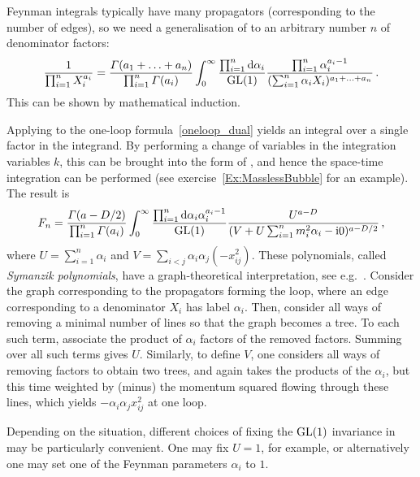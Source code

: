 Feynman integrals typically have many propagators (corresponding to the number of edges), so we need 
a generalisation of  to an arbitrary number $n$ of denominator factors:
\begin{align}\label{Feynman_general}
\frac{1}{ \prod_{i=1}^{n}  X_i^{a_i} }  = \frac{\Gamma(a_1 + \ldots + a_n) }{\prod_{i=1}^{n} \Gamma(a_i )}  \int_0^\infty \frac{ \prod_{i=1}^{n}  \d\alpha_i  }{{\rm GL}(1)}    
\frac{  \prod_{i=1}^{n}    \alpha_i^{a_i-1}  } { (\sum_{i=1}^{n} \alpha_i X_i)^{a_1 + \ldots + a_n } }\,.
\end{align}
This can be shown by mathematical induction.


Applying  to the one-loop formula~\eqref{oneloop_dual} yields an integral over a single factor in the integrand.
By performing a change of variables in the integration variables $k$, this can be brought into the form of ,
and hence the space-time integration can be performed (see exercise~\ref{Ex:MasslessBubble} for an example).
The result is
%
\begin{align}\label{oneloop_master}
F_{n} =  
\frac{\Gamma(a-D/2)}{\prod_{i=1}^{n} \Gamma(a_{i})}  
\int_{0}^{\infty}  \frac{   \prod_{i=1}^{n} 
 \d\alpha_{i} \alpha_{i}^{a_{i}-1} }{ {\rm GL}(1)} 
\frac{U^{a-D} }{ (V + U \sum_{i=1}^{n} m_{i}^2 \alpha_i  -\i 0)^{a-D/2}} \,,
\end{align}
where $U = \sum_{i=1}^{n} \alpha_{i}$ and $V = \sum_{i<j} \alpha_i \alpha_j (-x_{ij}^2)$.
These polynomials, called \emph{Symanzik polynomials}, have a graph-theoretical interpretation, see e.g.~\cite{ch4Smirnov:2012gma}. 
Consider the graph corresponding to the propagators forming the loop, where an edge corresponding to a denominator $X_i$ has label $\alpha_i$. 
Then, consider all ways of removing a minimal number of lines so that the graph becomes a tree. To each such term, associate the product of $\alpha_i$ factors of the removed factors. Summing over all such terms gives $U$. Similarly, to define $V$, one considers all ways of removing factors to obtain two trees, and again takes the products of the $\alpha_i$, but this time weighted by (minus) the momentum squared flowing through these lines, which yields $-\alpha_i \alpha_j x_{ij}^2$ at one loop.

Depending on the situation, different choices of fixing the  ${\rm GL}(1)$ invariance in  may be particularly convenient. One may fix $U=1$, for example, or alternatively one may set one of the Feynman parameters $\alpha_i$ to $1$.



